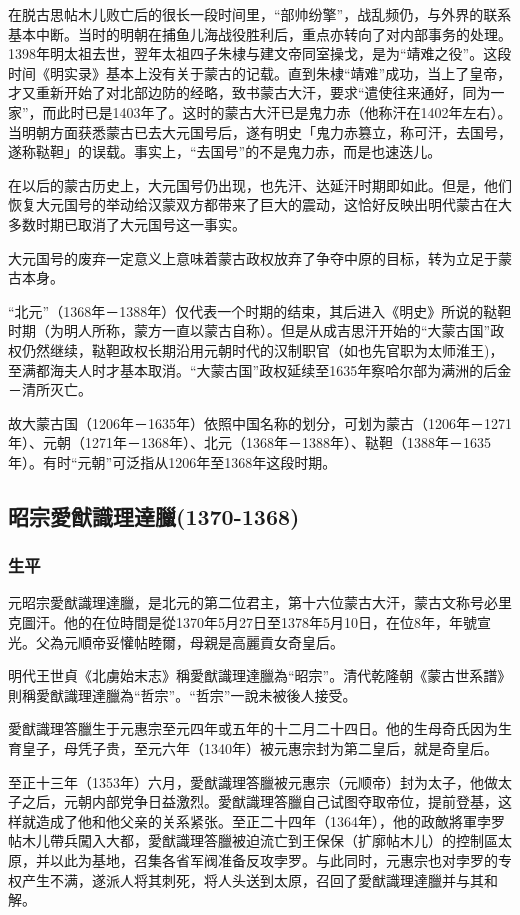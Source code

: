 在脱古思帖木儿败亡后的很长一段时间里，“部帅纷擎”，战乱频仍，与外界的联系基本中断。当时的明朝在捕鱼儿海战役胜利后，重点亦转向了对内部事务的处理。1398年明太祖去世，翌年太祖四子朱棣与建文帝同室操戈，是为“靖难之役”。这段时间《明实录》基本上没有关于蒙古的记载。直到朱棣“靖难”成功，当上了皇帝，才又重新开始了对北部边防的经略，致书蒙古大汗，要求“遣使往来通好，同为一家”，而此时已是1403年了。这时的蒙古大汗已是鬼力赤（他称汗在1402年左右）。当明朝方面获悉蒙古已去大元国号后，遂有明史「鬼力赤篡立，称可汗，去国号，遂称鞑靼」的误载。事实上，“去国号”的不是鬼力赤，而是也速迭儿。

在以后的蒙古历史上，大元国号仍出现，也先汗、达延汗时期即如此。但是，他们恢复大元国号的举动给汉蒙双方都带来了巨大的震动，这恰好反映出明代蒙古在大多数时期已取消了大元国号这一事实。

大元国号的废弃一定意义上意味着蒙古政权放弃了争夺中原的目标，转为立足于蒙古本身。

“北元”（1368年－1388年）仅代表一个时期的结束，其后进入《明史》所说的鞑靼时期（为明人所称，蒙方一直以蒙古自称）。但是从成吉思汗开始的“大蒙古国”政权仍然继续，鞑靼政权长期沿用元朝时代的汉制职官（如也先官职为太师淮王)，至满都海夫人时才基本取消。“大蒙古国”政权延续至1635年察哈尔部为满洲的后金－清所灭亡。

故大蒙古国（1206年－1635年）依照中国名称的划分，可划为蒙古（1206年－1271年）、元朝（1271年－1368年）、北元（1368年－1388年）、鞑靼（1388年－1635年）。有时“元朝”可泛指从1206年至1368年这段时期。

\subsection{昭宗愛猷識理達臘\tiny(1370-1368)}

\subsubsection{生平}

元昭宗愛猷識理達臘，是北元的第二位君主，第十六位蒙古大汗，蒙古文称号必里克圖汗。他的在位時間是從1370年5月27日至1378年5月10日，在位8年，年號宣光。父為元順帝妥懽帖睦爾，母親是高麗貢女奇皇后。

明代王世貞《北虜始末志》稱愛猷識理達臘為“昭宗”。清代乾隆朝《蒙古世系譜》則稱愛猷識理達臘為“哲宗”。“哲宗”一說未被後人接受。

愛猷識理答臘生于元惠宗至元四年或五年的十二月二十四日。他的生母奇氏因为生育皇子，母凭子贵，至元六年（1340年）被元惠宗封为第二皇后，就是奇皇后。

至正十三年（1353年）六月，愛猷識理答臘被元惠宗（元顺帝）封为太子，他做太子之后，元朝内部党争日益激烈。愛猷識理答臘自己试图夺取帝位，提前登基，这样就造成了他和他父亲的关系紧张。至正二十四年（1364年），他的政敵將軍孛罗帖木儿帶兵闖入大都，愛猷識理答臘被迫流亡到王保保（扩廓帖木儿）的控制區太原，并以此为基地，召集各省军阀准备反攻孛罗。与此同时，元惠宗也对孛罗的专权产生不满，遂派人将其刺死，将人头送到太原，召回了愛猷識理達臘并与其和解。

